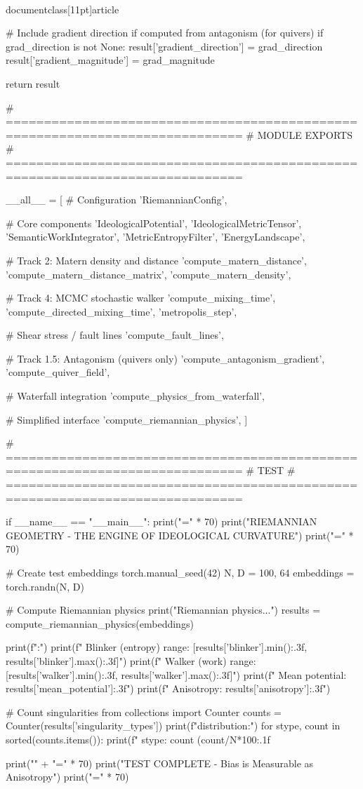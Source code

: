 \\documentclass[11pt]{article}
\begin{document}
\begin{CodeBlock}
    # Include gradient direction if computed from antagonism (for quivers)
    if grad_direction is not None:
        result['gradient_direction'] = grad_direction
        result['gradient_magnitude'] = grad_magnitude

    return result


# =============================================================================
# MODULE EXPORTS
# =============================================================================

__all__ = [
    # Configuration
    'RiemannianConfig',

    # Core components
    'IdeologicalPotential',
    'IdeologicalMetricTensor',
    'SemanticWorkIntegrator',
    'MetricEntropyFilter',
    'EnergyLandscape',

    # Track 2: Matern density and distance
    'compute_matern_distance',
    'compute_matern_distance_matrix',
    'compute_matern_density',

    # Track 4: MCMC stochastic walker
    'compute_mixing_time',
    'compute_directed_mixing_time',
    'metropolis_step',

    # Shear stress / fault lines
    'compute_fault_lines',

    # Track 1.5: Antagonism (quivers only)
    'compute_antagonism_gradient',
    'compute_quiver_field',

    # Waterfall integration
    'compute_physics_from_waterfall',

    # Simplified interface
    'compute_riemannian_physics',
]


# =============================================================================
# TEST
# =============================================================================

if __name__ == "__main__":
    print("=" * 70)
    print("RIEMANNIAN GEOMETRY - THE ENGINE OF IDEOLOGICAL CURVATURE")
    print("=" * 70)

    # Create test embeddings
    torch.manual_seed(42)
    N, D = 100, 64
    embeddings = torch.randn(N, D)

    # Compute Riemannian physics
    print("\nComputing Riemannian physics...")
    results = compute_riemannian_physics(embeddings)

    print(f"\nResults:")
    print(f"  Blinker (entropy) range: [{results['blinker'].min():.3f}, {results['blinker'].max():.3f}]")
    print(f"  Walker (work) range: [{results['walker'].min():.3f}, {results['walker'].max():.3f}]")
    print(f"  Mean potential: {results['mean_potential']:.3f}")
    print(f"  Anisotropy: {results['anisotropy']:.3f}")

    # Count singularities
    from collections import Counter
    counts = Counter(results['singularity_types'])
    print(f"\nSingularity distribution:")
    for stype, count in sorted(counts.items()):
        print(f"  {stype}: {count} ({count/N*100:.1f}%

    print("\n" + "=" * 70)
    print("TEST COMPLETE - Bias is Measurable as Anisotropy")
    print("=" * 70)

\end{CodeBlock}
\end{document}
